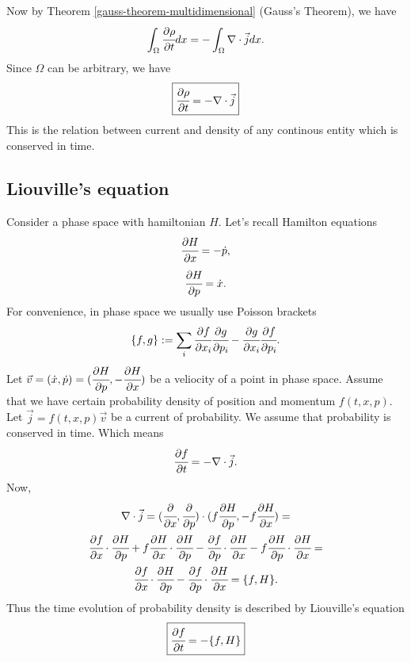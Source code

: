 \documentclass[main.tex]{subfiles}
\begin{document}
Now by Theorem \ref{gauss-theorem-multidimensional} (Gauss's Theorem), we have
\begin{equation}
\int_\Omega \cfrac{\partial \rho}{\partial t}dx = -\int_\Omega \nabla \cdot \vec{j}dx.
\end{equation}
Since $\Omega$ can be arbitrary, we have
\begin{equation}
\boxed{\cfrac{\partial \rho}{\partial t} = -\nabla \cdot \vec{j}}
\end{equation}
This is the relation between current and density of any continous entity which is conserved in time.

\subsection{Liouville's equation}
\label{liouville-equation}
Consider a phase space with hamiltonian $H$. Let's recall Hamilton equations
\begin{equation}
\cfrac{\partial H}{\partial x} = -\dot{p},
\end{equation}
\begin{equation}
\cfrac{\partial H}{\partial p} = \dot{x}.
\end{equation}
For convenience, in phase space we usually use Poisson brackets
\begin{equation}
\{f, g\} := \sum_i \cfrac{\partial f}{\partial x_i}\cfrac{\partial g}{\partial p_i} - \cfrac{\partial g}{\partial x_i}\cfrac{\partial f}{\partial p_i}. 
\end{equation}
Let $\vec{v} = (\dot{x}, \dot{p}) = (\cfrac{\partial H}{\partial p}, -\cfrac{\partial H}{\partial x})$ be a veliocity of a point in phase space. Assume that we have certain probability density of position and momentum $f(t, x, p)$.
Let $\vec{j} = f(t, x, p) \vec{v}$ be a current of probability. We assume that probability is conserved in time. Which means
\begin{equation}
\cfrac{\partial f}{\partial t} = -\nabla \cdot \vec{j}.
\end{equation}
Now,
\begin{multline}
\nabla \cdot \vec{j} = (\cfrac{\partial}{\partial x}, \cfrac{\partial}{\partial p}) \cdot (f\cfrac{\partial H}{\partial p}, -f\cfrac{\partial H}{\partial x}) = \\
\cfrac{\partial f}{\partial x} \cdot\cfrac{\partial H}{\partial p} + f\cfrac{\partial H}{\partial x} \cdot \cfrac{\partial H}{\partial p} - \cfrac{\partial f}{\partial p} \cdot\cfrac{\partial H}{\partial x} - f\cfrac{\partial H}{\partial p} \cdot \cfrac{\partial H}{\partial x} = \\
\cfrac{\partial f}{\partial x} \cdot\cfrac{\partial H}{\partial p} - \cfrac{\partial f}{\partial p} \cdot\cfrac{\partial H}{\partial x} =
\{f, H\}.
\end{multline}
Thus the time evolution of probability density is described by Liouville's equation
\begin{equation}
\boxed{
\cfrac{\partial f}{\partial t} = - \{f, H\}
}
\end{equation}
\end{document}
